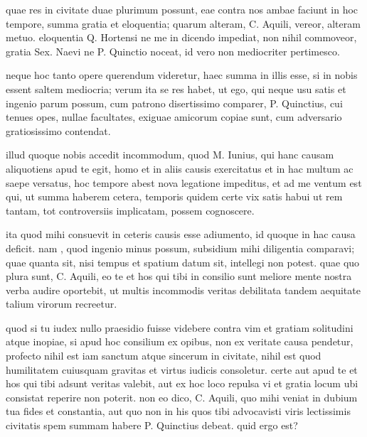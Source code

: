 
 quae res in civitate duae plurimum possunt, eae contra nos ambae faciunt in hoc tempore, summa gratia et eloquentia; quarum alteram, C. Aquili, vereor, alteram metuo. eloquentia Q. Hortensi ne me in dicendo impediat, non nihil commoveor, gratia Sex. Naevi ne P. Quinctio noceat, id vero non mediocriter pertimesco.

 neque hoc tanto opere querendum videretur, haec summa in illis esse, si in nobis essent saltem mediocria; verum ita se res habet, ut ego, qui neque usu satis et ingenio parum possum, cum patrono disertissimo comparer, P. Quinctius, cui tenues opes, nullae facultates, exiguae amicorum copiae sunt, cum adversario gratiosissimo contendat.

 illud quoque nobis accedit incommodum, quod M. Iunius, qui hanc causam aliquotiens apud te egit, homo et in aliis causis exercitatus et in hac multum ac saepe versatus, hoc tempore abest nova legatione impeditus, et ad me ventum est qui, ut summa haberem cetera, temporis quidem certe vix satis habui ut rem tantam, tot controversiis implicatam, possem cognoscere.

 ita quod mihi consuevit in ceteris causis esse adiumento, id quoque in hac causa deficit. nam , quod ingenio minus possum, subsidium mihi diligentia comparavi; quae quanta sit, nisi tempus et spatium datum sit, intellegi non potest. quae quo plura sunt, C. Aquili, eo te et hos qui tibi in consilio sunt meliore mente nostra verba audire oportebit, ut multis incommodis veritas debilitata tandem aequitate talium virorum recreetur.

 quod si tu iudex nullo praesidio fuisse videbere contra vim et gratiam solitudini atque inopiae, si apud hoc consilium ex opibus, non ex veritate causa pendetur, profecto nihil est iam sanctum atque sincerum in civitate, nihil est quod humilitatem cuiusquam gravitas et virtus iudicis consoletur. certe aut apud te et hos qui tibi adsunt veritas valebit, aut ex hoc loco repulsa vi et gratia locum ubi consistat reperire non poterit. non eo dico, C. Aquili, quo mihi veniat in dubium tua fides et constantia, aut quo non in his quos tibi advocavisti viris lectissimis civitatis spem summam habere P. Quinctius debeat. quid ergo est?

